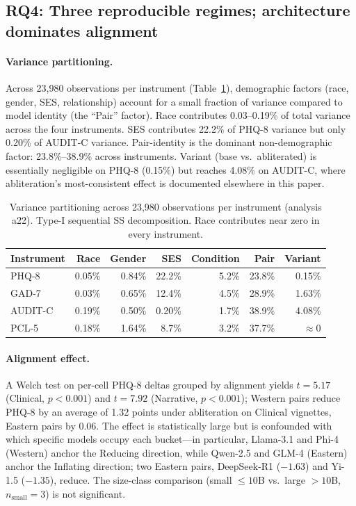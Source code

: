 \documentclass[11pt]{article}
\begin{document}
\subsection{RQ4: Three reproducible regimes; architecture dominates alignment}
\label{sec:rq4}

\paragraph{Variance partitioning.} Across 23{,}980 observations per instrument (Table~\ref{tab:var}), demographic factors (race, gender, SES, relationship) account for a small fraction of variance compared to model identity (the ``Pair'' factor). Race contributes 0.03--0.19\% of total variance across the four instruments. SES contributes 22.2\% of PHQ-8 variance but only 0.20\% of AUDIT-C variance. Pair-identity is the dominant non-demographic factor: 23.8\%--38.9\% across instruments. Variant (base vs.\ abliterated) is essentially negligible on PHQ-8 (0.15\%) but reaches 4.08\% on AUDIT-C, where abliteration's most-consistent effect is documented elsewhere in this paper.

\begin{table}[ht]
\centering
\caption{Variance partitioning across 23{,}980 observations per instrument (analysis a22). Type-I sequential SS decomposition. Race contributes near zero in every instrument.}
\label{tab:var}
\small
\begin{tabular}{lrrrrrr}
\toprule
Instrument & Race & Gender & SES & Condition & Pair & Variant \\
\midrule
PHQ-8   & 0.05\% & 0.84\% & 22.2\% & 5.2\% & 23.8\% & 0.15\% \\
GAD-7   & 0.03\% & 0.65\% & 12.4\% & 4.5\% & 28.9\% & 1.63\% \\
AUDIT-C & 0.19\% & 0.50\% &  0.20\% & 1.7\% & 38.9\% & 4.08\% \\
PCL-5   & 0.18\% & 1.64\% &  8.7\% & 3.2\% & 37.7\% & $\approx 0$ \\
\bottomrule
\end{tabular}
\end{table}

\paragraph{Alignment effect.} A Welch test on per-cell PHQ-8 deltas grouped by alignment yields $t = 5.17$ (Clinical, $p < 0.001$) and $t = 7.92$ (Narrative, $p < 0.001$); Western pairs reduce PHQ-8 by an average of 1.32 points under abliteration on Clinical vignettes, Eastern pairs by 0.06. The effect is statistically large but is confounded with which specific models occupy each bucket---in particular, Llama-3.1 and Phi-4 (Western) anchor the Reducing direction, while Qwen-2.5 and GLM-4 (Eastern) anchor the Inflating direction; two Eastern pairs, DeepSeek-R1 ($-1.63$) and Yi-1.5 ($-1.35$), reduce. The size-class comparison (small $\leq 10$B vs.\ large $> 10$B, $n_{\text{small}} = 3$) is not significant.
\end{document}
